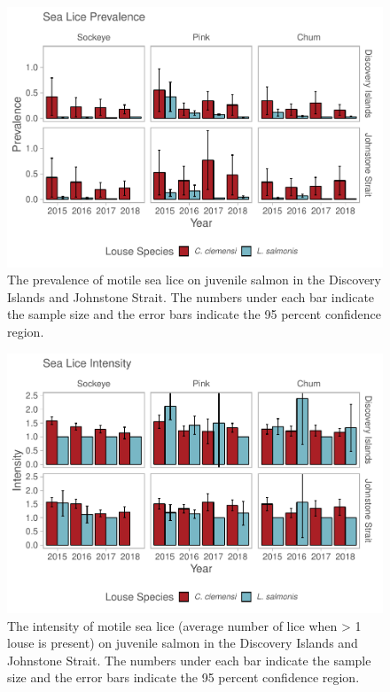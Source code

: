 \documentclass[fleqn,10pt]{wlpeerj} %
\begin{document}
\begin{figure}[H]
\includegraphics[width=0.9\linewidth]{Migration_Observations_Report_files/figure-latex/sealice-prevalence-plot-1} \caption{The prevalence of motile sea lice on juvenile salmon in the Discovery Islands and Johnstone Strait. The numbers under each bar indicate the sample size and the error bars indicate the 95 percent confidence region.}\label{fig:sealice-prevalence-plot}
\end{figure}

\begin{figure}[H]
\includegraphics[width=0.9\linewidth]{Migration_Observations_Report_files/figure-latex/sealice-intensity-plot-1} \caption{The intensity of motile sea lice (average number of lice when > 1 louse is present) on juvenile salmon in the Discovery Islands and Johnstone Strait. The numbers under each bar indicate the sample size and the error bars indicate the 95 percent confidence region.}\label{fig:sealice-intensity-plot}
\end{figure}
\end{document}
